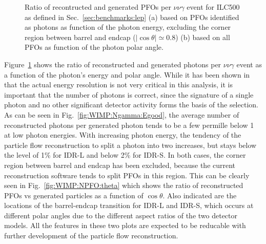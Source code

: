 \begin{figure}[htbp]
\caption{Ratio of recontructed and generated PFOs per $\nu\nu\gamma$ event for ILC500 as defined in Sec.~\ref{sec:benchmarks:lep}
(a) based on PFOs identified as photons as function of the photon energy, excluding the corner region between barrel and endcap ($|\cos{\theta}|\simeq 0.8$)
(b) based on all PFOs as function of the photon polar angle.}

\label{fig:WIMP:Ngamma}
\end{figure}

Figure~\ref{fig:WIMP:Ngamma} shows the ratio of reconstructed and generated photons per $\nu\nu\gamma$ event as a function of
the photon's energy and polar angle. While it has been shown in~\cite{Habermehl:2018yul} that the actual energy
resolution is not very critical in this analysis, it is important that the number of photons is correct, since the signature of a single photon and no other significant detector activity forms the basis of the selection.
As can be seen in Fig.~\ref{fig:WIMP:Ngamma:Egood}, the average number of reconstructed photons per generated photon tends to be a few permille below 1 at low photon energies. With increasing photon energy, the tendency of the particle flow reconstruction to split a photon into two increases, but stays below the level of 1\% for IDR-L and below 2\% for IDR-S. In both cases, the corner region between barrel and endcap has been excluded, because the current reconstruction software tends to split PFOs in this region. This can be clearly seen in 
Fig.~\ref{fig:WIMP:NPFO:theta} which shows the ratio of reconstructed PFOs vs generated particles as a function of $\cos{\theta}$. Also indicated are the locations of the barrel-endcap transition for IDR-L and IDR-S, which occurs at different polar angles due to the different aspect ratios of the two detector models.  All the features in these two plots are expected to be reducable with further development of the particle flow reconstruction.

